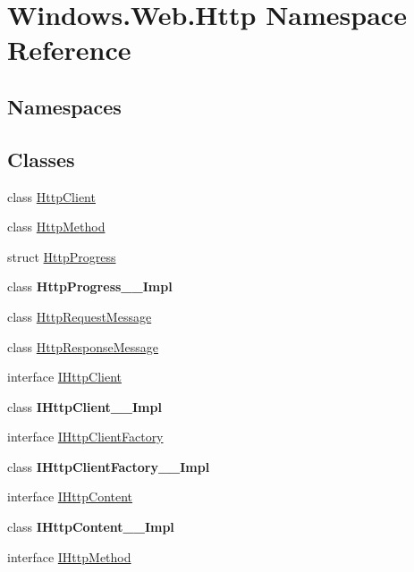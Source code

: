 \hypertarget{namespace_windows_1_1_web_1_1_http}{}\section{Windows.\+Web.\+Http Namespace Reference}
\label{namespace_windows_1_1_web_1_1_http}
\subsection*{Namespaces}
\begin{DoxyCompactItemize}
\end{DoxyCompactItemize}
\subsection*{Classes}
\begin{DoxyCompactItemize}
\item 
class \hyperlink{class_windows_1_1_web_1_1_http_1_1_http_client}{Http\+Client}
\item 
class \hyperlink{class_windows_1_1_web_1_1_http_1_1_http_method}{Http\+Method}
\item 
struct \hyperlink{struct_windows_1_1_web_1_1_http_1_1_http_progress}{Http\+Progress}
\item 
class {\bfseries Http\+Progress\+\_\+\+\_\+\+Impl}
\item 
class \hyperlink{class_windows_1_1_web_1_1_http_1_1_http_request_message}{Http\+Request\+Message}
\item 
class \hyperlink{class_windows_1_1_web_1_1_http_1_1_http_response_message}{Http\+Response\+Message}
\item 
interface \hyperlink{interface_windows_1_1_web_1_1_http_1_1_i_http_client}{I\+Http\+Client}
\item 
class {\bfseries I\+Http\+Client\+\_\+\+\_\+\+Impl}
\item 
interface \hyperlink{interface_windows_1_1_web_1_1_http_1_1_i_http_client_factory}{I\+Http\+Client\+Factory}
\item 
class {\bfseries I\+Http\+Client\+Factory\+\_\+\+\_\+\+Impl}
\item 
interface \hyperlink{interface_windows_1_1_web_1_1_http_1_1_i_http_content}{I\+Http\+Content}
\item 
class {\bfseries I\+Http\+Content\+\_\+\+\_\+\+Impl}
\item 
interface \hyperlink{interface_windows_1_1_web_1_1_http_1_1_i_http_method}{I\+Http\+Method}
\item 

\end{DoxyCompactItemize}
